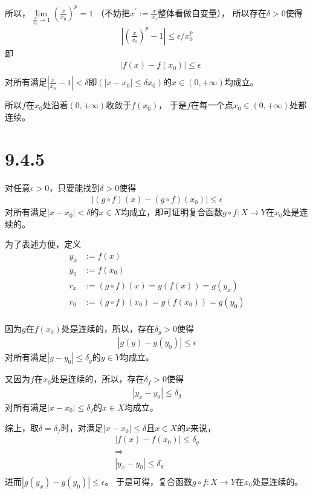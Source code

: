 \documentclass{article}
\begin{document}
所以，$\lim\limits_{\frac{x}{x_0} \rightarrow 1} (\frac{x}{x_0})^p = 1$
（不妨把$x^\prime := \frac{x}{x_0}$整体看做自变量），
所以存在$\delta > 0$使得
\begin{align*}
  | (\frac{x}{x_0})^p - 1 | \leq \epsilon / x_0^p
\end{align*}
即
\begin{align*}
   & |f(x) - f(x_0)| \leq \epsilon \\
\end{align*}
对所有满足$|\frac{x}{x_0} - 1| < \delta$即$(|x - x_0| \leq \delta x_0)$的$x \in (0, +\infty)$均成立。

所以$f$在$x_0$处沿着$(0, +\infty)$收敛于$f(x_0)$，
于是$f$在每一个点$x_0 \in (0, +\infty)$处都连续。

\section*{9.4.5}
对任意$\epsilon > 0$，只要能找到$\delta > 0$使得
\begin{align*}
  |(g \circ f)(x) - (g \circ f)(x_0)| \leq \epsilon
\end{align*}
对所有满足$|x - x_0| < \delta$的$x \in X$均成立，即可证明复合函数$g \circ f: X \rightarrow Y$在$x_0$处是连续的。

为了表述方便，定义
\begin{align*}
  y_x & := f(x)                                  \\
  y_0 & := f(x_0)                                \\
  r_x & := (g \circ f)(x) = g(f(x))  = g(y_x)    \\
  r_0 & := (g \circ f)(x_0) = g(f(x_0)) = g(y_0) \\
\end{align*}

因为$g$在$f(x_0)$处是连续的，所以，存在$\delta_{g} > 0$使得
\begin{align*}
  |g(y) - g(y_0)| \leq \epsilon
\end{align*}
对所有满足$|y - y_0| \leq \delta_{g}$的$y \in Y$均成立。

又因为$f$在$x_0$处是连续的，所以，存在$\delta_{f} > 0$使得
\begin{align*}
  |y_x - y_0| \leq \delta_{g}
\end{align*}
对所有满足$|x - x_0| \leq \delta_{f}$的$x \in X$均成立。

综上，取$\delta = \delta_{f}$时，对满足$|x - x_0| \leq \delta$且$x \in X$的$x$来说，
\begin{align*}
  |f(x) - f(x_0)| \leq \delta_{g} \\
  \Rightarrow                     \\
  |y_x - y_0| \leq \delta_{g}     \\
\end{align*}
进而$|g(y_x) - g(y_0)| \leq \epsilon$。
于是可得，复合函数$g \circ f: X \rightarrow Y$在$x_0$处是连续的。
\end{document}
